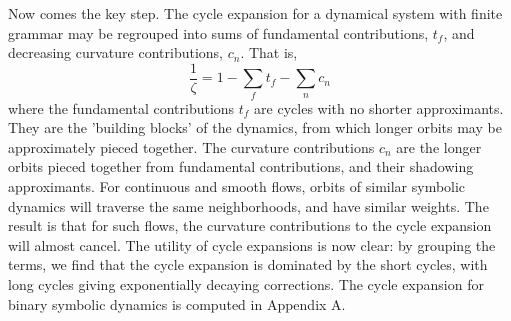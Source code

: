\documentclass[twocolumn,aip,cha]{revtex4-1}
\begin{document}
\indent Now comes the key step. The cycle expansion for a dynamical system with finite grammar may be regrouped into sums of fundamental contributions, $t_{f}$, and decreasing curvature contributions, $c_{n}$. That is,
\begin{equation}
\frac{1}{\zeta} = 1 - \sum_{f}t_{f} - \sum_{n}c_{n}
\end{equation}
where the fundamental contributions $t_{f}$ are cycles with no shorter approximants. They are the 'building blocks' of the dynamics, from which longer orbits may be approximately pieced together. The curvature contributions $c_{n}$ are the longer orbits pieced together from fundamental contributions, and their shadowing approximants. For continuous and smooth flows, orbits of similar symbolic dynamics will traverse the same neighborhoods, and have similar weights. The result is that for such flows, the curvature contributions to the cycle expansion will almost cancel. The utility of cycle expansions is now clear: by grouping the terms, we find that the cycle expansion is dominated by the short cycles, with long cycles giving exponentially decaying corrections. The cycle expansion for binary symbolic dynamics is computed in Appendix A.
\end{document}
